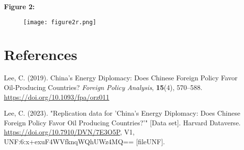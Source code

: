 \documentclass[12pt,letterpaper]{article}
\begin{document}
\textbf{Figure 2:}
 

\begin{figure}[H]
    \centering
    \texttt{[image: figure2r.png]}
\end{figure}

\newpage
\section{References}

\noindent Lee, C. (2019). China’s Energy Diplomacy: Does Chinese Foreign Policy Favor Oil-Producing Countries? \textit{Foreign Policy Analysis}, \textbf{15}(4), 570–588. \url{https://doi.org/10.1093/fpa/orz011} \\

\vspace{0.25cm}

\noindent Lee, C. (2023). "Replication data for 'China's Energy Diplomacy: Does Chinese Foreign Policy Favor Oil Producing Countries?'" [Data set]. Harvard Dataverse. \url{https://doi.org/10.7910/DVN/7E3O5P}, V1, UNF:6:x+exuF4WVfknqWQhUWz4MQ== [fileUNF].
\end{document}
